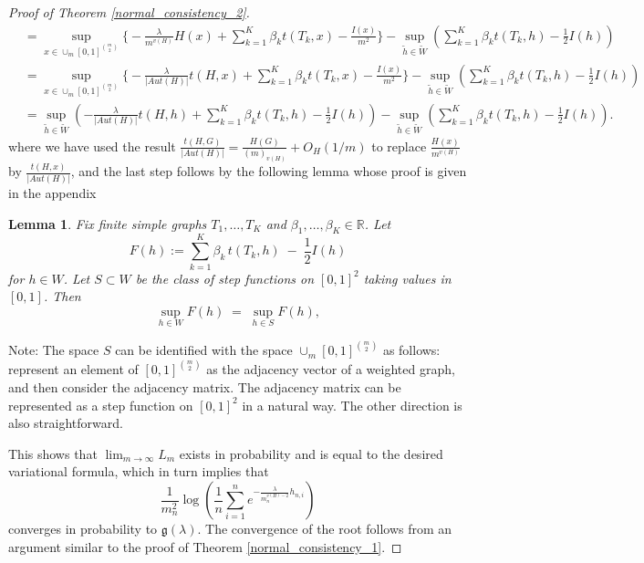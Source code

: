 \documentclass[12pt]{article}
\numberwithin{equation}{section}
\newtheorem{lemma}{Lemma}[section]
\begin{document}
\begin{proof}[Proof of Theorem \ref{normal_consistency_2}]
\begin{align*}
&= \sup_{x\in\cup_{m}[0,1]^{{m\choose 2}}}\Biggl\{-\frac{\lambda}{m^{v(H)}}H(x) + \sum_{k=1}^{K}\beta_k t(T_k,x) - \frac{I(x)}{m^2}\Biggr\} - \sup_{\tilde{h}\in\tilde{W}}\left( \sum_{k=1}^K \beta_k t(T_k, h)-\frac{1}{2} I(h)\right)\\
&= \sup_{x\in\cup_{m}[0,1]^{{m\choose 2}}}\Biggl\{-\frac{\lambda}{\lvert Aut(H)\rvert}t(H,x) + \sum_{k=1}^{K}\beta_k t(T_k,x) - \frac{I(x)}{m^2}\Biggr\} - \sup_{\tilde{h}\in\tilde{W}}\left( \sum_{k=1}^K \beta_k t(T_k, h)-\frac{1}{2} I(h)\right)\\
&= \sup_{\tilde{h}\in\tilde{W}}\left(-\frac{\lambda}{\lvert Aut(H) \rvert} t(H,h) + \sum_{k=1}^K \beta_k t(T_k, h)-\frac{1}{2} I(h)\right) - \sup_{\tilde{h}\in\tilde{W}}\left( \sum_{k=1}^K \beta_k t(T_k, h)-\frac{1}{2} I(h)\right).
\end{align*}
where we have used the result \(\frac{t(H,G)}{\lvert Aut(H)\rvert}  = \frac{H(G)}{(m)_{v(H)}} + O_H(1/m)\) to replace \(\frac{H(x)}{m^{v(H)}}\) by \(\frac{t(H,x)}{\lvert Aut(H)\rvert}\), and the last step follows by the following lemma whose proof is given in the appendix

\begin{lemma}{\label{density}}
Fix finite simple graphs $T_1,\dots,T_K$ and $\beta_1,\dots,\beta_K\in\mathbb{R}$.
Let
\[
F(h):=\sum_{k=1}^K \beta_k\,t(T_k,h)\;-\;\frac{1}{2}I(h)
\]
for \(h\in W\).
Let $S\subset W$ be the class of step functions on \([0,1]^2\) taking values in \([0,1]\).
Then
\[
\sup_{h\in W} F(h)\;=\;\sup_{h\in S} F(h),
\]

\end{lemma}

Note: The space \(S\) can be identified with the space \(\cup_m [0,1]^{m\choose 2}\) as follows: represent an element of \([0,1]^{m\choose 2}\) as the adjacency vector of a weighted graph, and then consider the adjacency matrix. The adjacency matrix can be represented as a step function on \([0,1]^2\) in a natural way. The other direction is also straightforward.



This shows that $\lim_{m\to\infty} L_m$ exists in probability and is equal to the desired variational formula, which in turn implies that
\[
\frac{1}{m_n^2}\log\left(\frac{1}{n}\sum_{i=1}^n e^{-\frac{\lambda}{m_n^{v(H)-2}} h_{n,i}}\right)
\]
converges in probability to $\mathfrak{g}(\lambda)$. The convergence of the root follows from an argument similar to the proof of Theorem \ref{normal_consistency_1}.

\end{proof}
\end{document}
